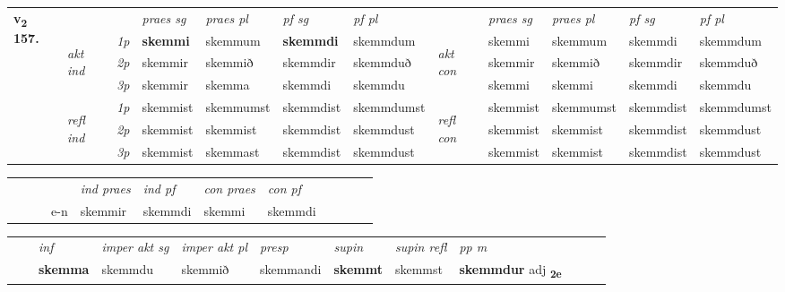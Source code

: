 \begin{tabular}{llllllllllll} \toprule
\multirow{4}{*}{{{\textbf{v{\textsubscript{2}}} \Large{\textbf{157.}}}}}  & &   &  \textit{praes sg}  & \textit{praes pl}  &\textit{ pf sg} & \textit{pf pl} &  &  \textit{praes sg}  & \textit{praes pl}  & \textit{pf sg} & \textit{pf pl } \\*
	\cmidrule{4-7} \cmidrule{9-12}
 & \multirow{3}{*}{\begin{turn}{90}\textit{akt ind}\end{turn}} & {\textit{1p}} & \textbf{skemmi} & skemmum    & \textbf{skemmdi} & skemmdum & \multirow{3}{*}{\begin{turn}{90}\textit{akt con}\end{turn}} &skemmi & skemmum & skemmdi & skemmdum\\*
& &  {\textit{2p}} &  skemmir  & skemmið   & skemmdir & skemmduð & & skemmir & skemmið & skemmdir & skemmduð \\*
& &  {\textit{3p}} & skemmir & skemma   & skemmdi & skemmdu & & skemmi & skemmi& skemmdi & skemmdu  \\*
\cmidrule{4-7} \cmidrule{9-12}
 &\multirow{3}{*}{\begin{turn}{90}\textit{refl ind}\end{turn}} & {\textit{1p}} & skemmist & skemmumst    & skemmdist & skemmdumst & \multirow{3}{*}{\begin{turn}{90}\textit{refl con}\end{turn}}  &skemmist & skemmumst & skemmdist & skemmdumst\\*
 &&  {\textit{2p}} &  skemmist  & skemmist   & skemmdist & skemmdust & &skemmist & skemmist & skemmdist & skemmdust \\*
& &  {\textit{3p}} & skemmist & skemmast   & skemmdist & skemmdust & & skemmist & skemmist& skemmdist & skemmdust  \\*
\cmidrule{4-7} \cmidrule{9-12}
\end{tabular}


\begin{tabular}{llllllllllll}
 & &  & &  \textit{ind praes} & \textit{ind pf} & \textit{con praes} & \textit{con pf} \\*
&  & & e-n & skemmir & skemmdi & skemmi & skemmdi \\*
\cmidrule{5-9}
\end{tabular}


\begin{tabular}{llllllllllll}
 & & \textit{inf} & \textit{imper akt sg} & \textit{imper akt pl}   & \textit{presp} & \textit{supin} & \textit{supin refl} & \textit{pp m}     \\*
  & & \textbf{skemma} & skemmdu  & skemmið   & skemmandi &  \textbf{skemmt} & skemmst & \textbf{skemmdur} adj \textbf{\textsubscript{2e}} \\*
\cmidrule{1-12}
\end{tabular}



